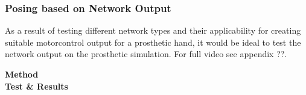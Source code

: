 \documentclass[../main.tex]{subfiles}
\begin{document}
\subsubsection{Posing based on Network Output}

As a result of testing different network types and their applicability for creating suitable motorcontrol output for a prosthetic hand, it would be ideal to test the network output on the prosthetic simulation.
For full video see appendix ??.

\textbf{Method}\\

\textbf{Test \& Results}\\





\end{document}
